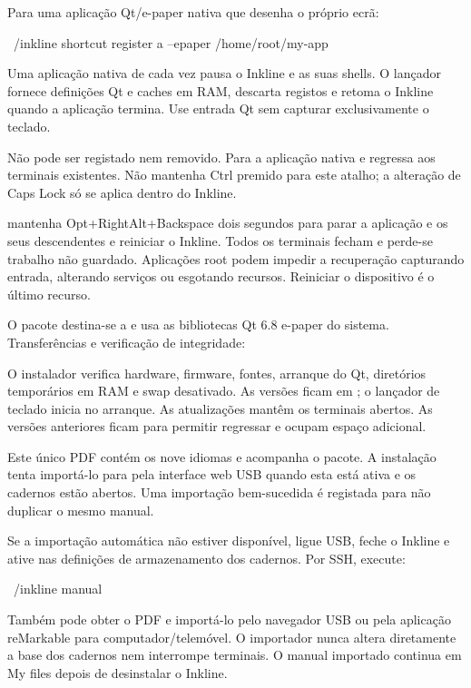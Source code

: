 Para uma aplicação Qt/e-paper nativa que desenha o próprio ecrã:
\begin{shell}
~/inkline shortcut register a --epaper /home/root/my-app
\end{shell}
Uma aplicação nativa de cada vez pausa o Inkline e as suas shells. O lançador
fornece definições Qt e caches em RAM, descarta registos e retoma o Inkline
quando a aplicação termina. Use entrada Qt sem capturar exclusivamente o teclado.

\begin{notice}
 Não pode ser registado nem removido.
Para a aplicação nativa e regressa aos terminais existentes. Não mantenha Ctrl premido para este atalho; a alteração de Caps Lock só se aplica dentro do Inkline.
\end{notice}

 mantenha Opt+RightAlt+Backspace dois segundos para parar a
aplicação e os seus descendentes e reiniciar o Inkline. Todos os terminais
fecham e perde-se trabalho não guardado. Aplicações root podem impedir a
recuperação capturando entrada, alterando serviços ou esgotando recursos.
Reiniciar o dispositivo é o último recurso.

O pacote destina-se a  e usa as bibliotecas
Qt 6.8 e-paper do sistema. Transferências e verificação de integridade:

\InstallLink

O instalador verifica hardware, firmware, fontes, arranque do Qt, diretórios
temporários em RAM e swap desativado. As versões ficam em
; o lançador de teclado inicia no arranque.
As atualizações mantêm os terminais abertos.  As versões anteriores ficam para permitir regressar
e ocupam espaço adicional.

Este único PDF contém os nove idiomas e acompanha o pacote. A instalação tenta
importá-lo para  pela interface web USB quando esta está ativa
e os cadernos estão abertos. Uma importação bem-sucedida é registada para não
duplicar o mesmo manual.

Se a importação automática não estiver disponível, ligue USB, feche o Inkline
e ative  nas definições de armazenamento dos cadernos.
Por SSH, execute:
\begin{shell}
~/inkline manual
\end{shell}
Também pode obter o PDF e importá-lo pelo navegador USB ou pela aplicação
reMarkable para computador/telemóvel. O importador nunca altera diretamente
a base dos cadernos nem interrompe terminais. O manual importado continua
em My files depois de desinstalar o Inkline.

